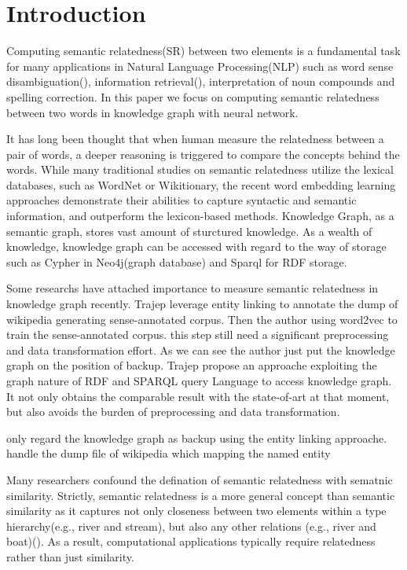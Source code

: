\section{Introduction}
Computing semantic relatedness(SR) between two elements is a fundamental 
task for many applications in Natural Language Processing(NLP) such as 
word sense disambiguation(\cite{}), information retrieval(\cite{}), 
interpretation of noun compounds and spelling correction.  In this paper 
we focus on computing semantic relatedness between two words in knowledge 
graph with neural network.

It has long been thought that when human measure the relatedness between 
a pair of words, a deeper reasoning is triggered to compare the concepts 
behind the words. While many traditional studies on semantic relatedness 
utilize the lexical databases, such as WordNet or Wikitionary\cite{}, 
the recent word embedding learning approaches demonstrate their abilities 
to capture syntactic and semantic information, and outperform the 
lexicon-based methods\cite{}. Knowledge Graph, as a semantic graph, stores
vast amount of sturctured knowledge. As a wealth of knowledge, knowledge 
graph can be accessed with regard to the way of storage such as Cypher
in Neo4j(graph database) and Sparql for RDF storage.

Some researchs have attached importance to measure semantic relatedness
in knowledge graph\cite{REWORD, SenseEmbed} recently. Trajep\cite{SenseEmbed} 
leverage entity linking to annotate the dump of wikipedia generating 
sense-annotated corpus.
Then the author using word2vec to train the sense-annotated corpus. this
step still need a significant preprocessing and data transformation effort.
As we can see the author just put the knowledge graph on the position 
of backup. Trajep \cite{REWORD} propose an approache exploiting the
graph nature of RDF and SPARQL query Language to access knowledge graph. 
It not only obtains the comparable result with the state-of-art at that moment,
but also avoids the burden of preprocessing and data transformation. 


only regard the  knowledge graph as backup using the entity linking approache. 
\cite{SenseEmbed} handle the dump file of wikipedia which mapping the 
named entity 

Many researchers confound the defination of semantic relatedness with sematnic similarity.
Strictly, semantic relatedness is a more general concept than semantic 
similarity as it captures not only closeness between two elements within
a type hierarchy(e.g., river and stream), but also any other relations
(e.g., river and boat)(\cite{BudanitskyH06}). As a result, computational
applications typically require relatedness rather than just similarity.



